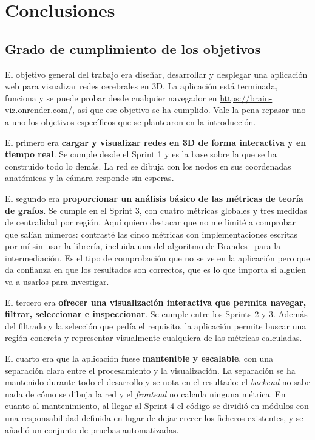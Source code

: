 \chapter{Conclusiones}

\section{Grado de cumplimiento de los objetivos}

El objetivo general del trabajo era diseñar, desarrollar y desplegar una aplicación web para
visualizar redes cerebrales en 3D. La aplicación está terminada, funciona y se puede probar desde
cualquier navegador en \url{https://brain-viz.onrender.com/}, así que ese objetivo se ha cumplido.
Vale la pena repasar uno a uno los objetivos específicos que se plantearon en la introducción.

El primero era \textbf{cargar y visualizar redes en 3D de forma interactiva y en tiempo real}. Se
cumple desde el Sprint 1 y es la base sobre la que se ha construido todo lo demás. La red se dibuja
con los nodos en sus coordenadas anatómicas y la cámara responde sin esperas.

El segundo era \textbf{proporcionar un análisis básico de las métricas de teoría de grafos}. Se
cumple en el Sprint 3, con cuatro métricas globales y tres medidas de centralidad por región. Aquí
quiero destacar que no me limité a comprobar que salían números: contrasté las cinco métricas con
implementaciones escritas por mí sin usar la librería, incluida una del algoritmo de Brandes~\cite{brandes} para la
intermediación. Es el tipo de comprobación que no se ve en la aplicación pero que da confianza en
que los resultados son correctos, que es lo que importa si alguien va a usarlos para investigar.

El tercero era \textbf{ofrecer una visualización interactiva que permita navegar, filtrar,
seleccionar e inspeccionar}. Se cumple entre los Sprints 2 y 3. Además del filtrado y la selección
que pedía el requisito, la aplicación permite buscar una región concreta y representar visualmente
cualquiera de las métricas calculadas.

El cuarto era que la aplicación fuese \textbf{mantenible y escalable}, con una separación clara entre
el procesamiento y la visualización. La separación se ha mantenido durante todo el desarrollo y se
nota en el resultado: el \textit{backend} no sabe nada de cómo se dibuja la red y el \textit{frontend}
no calcula ninguna métrica. En cuanto al mantenimiento, al llegar al Sprint 4 el código se dividió en
módulos con una responsabilidad definida en lugar de dejar crecer los ficheros existentes, y se
añadió un conjunto de pruebas automatizadas.

